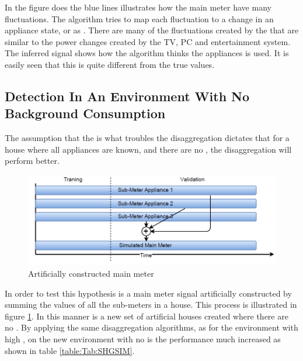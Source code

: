 In the figure does the blue lines illustrates how the main meter have many fluctuations. The algorithm tries to map each fluctuation to a change in an appliance state, or as . There are many of the fluctuations created by the  that are similar to the power changes created by the TV, PC and entertainment system. The inferred signal shows how the algorithm thinks the appliances is used. It is easily seen that this is quite different from the true values. 

\subsection{Detection In An Environment With No Background Consumption}
\label{sec:NOISEFREE}
The assumption that the  is what troubles the disaggregation dictates that for a house where all appliances are known, and there are no , the disaggregation will perform better. 

\begin{figure}[H]
\centering
\includegraphics[width=1\textwidth]{billeder/SimIllu.png}
\caption{Artificially constructed main meter}
\label{fig:SIL}
\end{figure}

In order to test this hypothesis is a main meter signal artificially constructed by summing the values of all the sub-meters in a house. This process is illustrated in figure \ref{fig:SIL}. In this manner is a new set of artificial houses created where there are no . By applying the same disaggregation algorithms, as for the environment with high , on the new environment with no  is the performance much increased as shown in table \ref{table:Tab:SHGSIM}.

  


